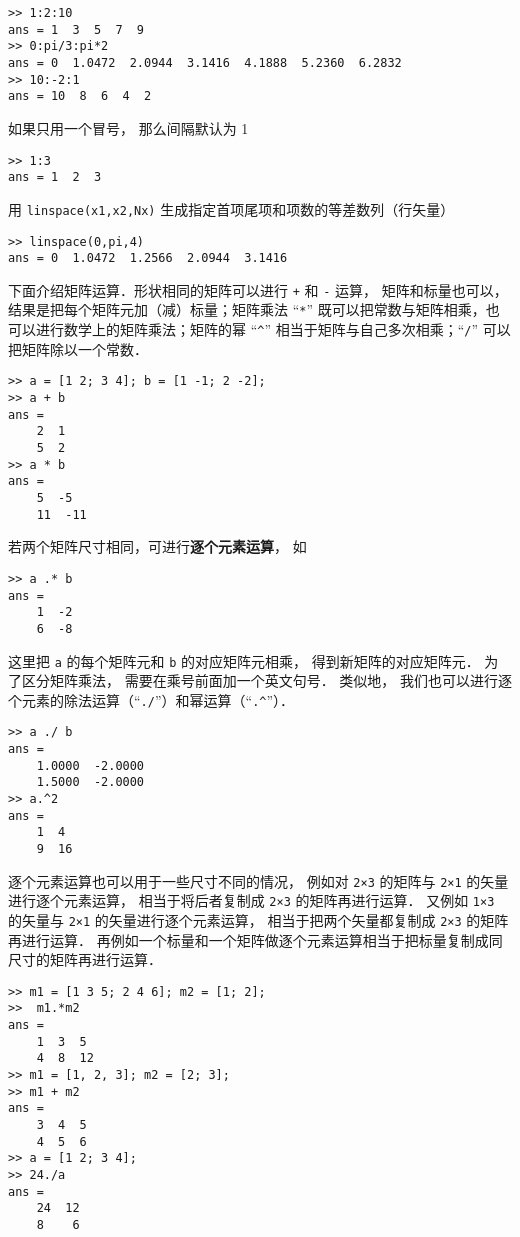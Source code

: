 \begin{lstlisting}[language=MatlabCom]
>> 1:2:10
ans = 1  3  5  7  9
>> 0:pi/3:pi*2
ans = 0  1.0472  2.0944  3.1416  4.1888  5.2360  6.2832
>> 10:-2:1
ans = 10  8  6  4  2
\end{lstlisting}
如果只用一个冒号， 那么间隔默认为 1
\begin{lstlisting}[language=MatlabCom]
>> 1:3
ans = 1  2  3
\end{lstlisting}
用 \lstinline|linspace(x1,x2,Nx)| 生成指定首项尾项和项数的等差数列（行矢量）
\begin{lstlisting}[language=MatlabCom]
>> linspace(0,pi,4)
ans = 0  1.0472  1.2566  2.0944  3.1416
\end{lstlisting}

下面介绍矩阵运算．形状相同的矩阵可以进行 \lstinline|+| 和 \lstinline|-| 运算， 矩阵和标量也可以， 结果是把每个矩阵元加（减）标量；矩阵乘法 “\lstinline|*|” 既可以把常数与矩阵相乘，也可以进行数学上的矩阵乘法；矩阵的幂 “\lstinline|^|” 相当于矩阵与自己多次相乘；“\lstinline|/|” 可以把矩阵除以一个常数．
\begin{lstlisting}[language=MatlabCom]
>> a = [1 2; 3 4]; b = [1 -1; 2 -2];
>> a + b
ans =
    2  1
    5  2
>> a * b
ans =
    5  -5
    11  -11
\end{lstlisting}
若两个矩阵尺寸相同，可进行\textbf{逐个元素运算}， 如
\begin{lstlisting}[language=MatlabCom]
>> a .* b
ans =
    1  -2
    6  -8
\end{lstlisting}
这里把 \lstinline|a| 的每个矩阵元和 \lstinline|b| 的对应矩阵元相乘， 得到新矩阵的对应矩阵元． 为了区分矩阵乘法， 需要在乘号前面加一个英文句号． 类似地， 我们也可以进行逐个元素的除法运算（“\lstinline|./|”）和幂运算（“\lstinline|.^|”）．
\begin{lstlisting}[language=MatlabCom]
>> a ./ b
ans =
    1.0000  -2.0000
    1.5000  -2.0000
>> a.^2
ans =
    1  4
    9  16
\end{lstlisting}

逐个元素运算也可以用于一些尺寸不同的情况， 例如对 \lstinline|2×3| 的矩阵与 \lstinline|2×1| 的矢量进行逐个元素运算， 相当于将后者复制成 \lstinline|2×3| 的矩阵再进行运算． 又例如 \lstinline|1×3| 的矢量与 \lstinline|2×1| 的矢量进行逐个元素运算， 相当于把两个矢量都复制成 \lstinline|2×3| 的矩阵再进行运算． 再例如一个标量和一个矩阵做逐个元素运算相当于把标量复制成同尺寸的矩阵再进行运算．

\begin{lstlisting}[language=MatlabCom]
>> m1 = [1 3 5; 2 4 6]; m2 = [1; 2];
>>  m1.*m2
ans =
    1  3  5
    4  8  12
>> m1 = [1, 2, 3]; m2 = [2; 3];
>> m1 + m2
ans =
    3  4  5
    4  5  6
>> a = [1 2; 3 4];
>> 24./a
ans =
    24  12
    8    6
\end{lstlisting}

